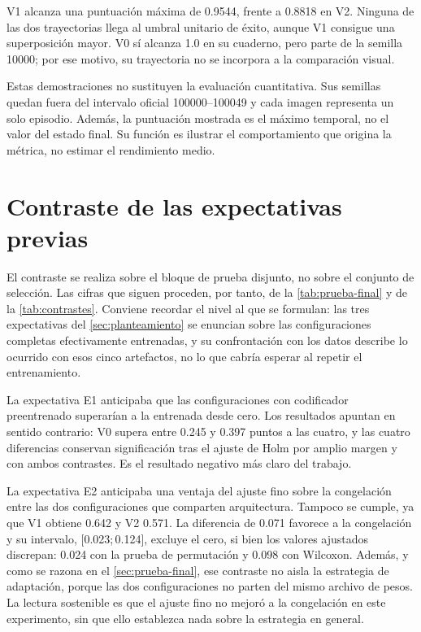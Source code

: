 V1 alcanza una puntuaci\'on m\'axima de \num{0.9544}, frente a \num{0.8818} en V2. Ninguna
de las dos trayectorias llega al umbral unitario de \'exito, aunque V1 consigue una
superposici\'on mayor. V0 s\'i alcanza \num{1.0} en su cuaderno, pero parte de la semilla
\num{10000}; por ese motivo, su trayectoria no se incorpora a la comparaci\'on visual.

Estas demostraciones no sustituyen la evaluaci\'on cuantitativa. Sus semillas quedan fuera
del intervalo oficial \num{100000}--\num{100049} y cada imagen representa un solo episodio.
Adem\'as, la puntuaci\'on mostrada es el m\'aximo temporal, no el valor del estado final.
Su funci\'on es ilustrar el comportamiento que origina la m\'etrica, no estimar el
rendimiento medio.

\section{Contraste de las expectativas previas}
\label{sec:contraste-hipotesis}

El contraste se realiza sobre el bloque de prueba disjunto, no sobre el conjunto de
selecci\'on. Las cifras que siguen proceden, por tanto, de la \cref{tab:prueba-final} y de
la \cref{tab:contrastes}. Conviene recordar el nivel al que se formulan: las tres
expectativas del \cref{sec:planteamiento} se enuncian sobre las configuraciones completas
efectivamente entrenadas, y su confrontaci\'on con los datos describe lo ocurrido con
esos cinco artefactos, no lo que cabr\'ia esperar al repetir el entrenamiento.

La expectativa E1 anticipaba que las configuraciones con codificador preentrenado
superar\'ian a la entrenada desde cero. Los resultados apuntan en sentido contrario: V0
supera entre \num{0.245} y \num{0.397} puntos a las cuatro, y las cuatro diferencias
conservan significaci\'on tras el ajuste de Holm por amplio margen y con ambos contrastes.
Es el resultado negativo m\'as claro del trabajo.

La expectativa E2 anticipaba una ventaja del ajuste fino sobre la congelaci\'on entre las
dos configuraciones que comparten arquitectura. Tampoco se cumple, ya que V1 obtiene
\num{0.642} y V2 \num{0.571}. La diferencia de \num{0.071} favorece a la congelaci\'on y su
intervalo, {[\num{0.023};\,\num{0.124}]}, excluye el cero, si bien los valores ajustados
discrepan: \num{0.024} con la prueba de permutaci\'on y \num{0.098} con Wilcoxon. Adem\'as,
y como se razona en el \cref{sec:prueba-final}, ese contraste no aisla la estrategia de
adaptaci\'on, porque las dos configuraciones no parten del mismo archivo de pesos. La
lectura sostenible es que el ajuste fino no mejor\'o a la congelaci\'on en este experimento,
sin que ello establezca nada sobre la estrategia en general.

